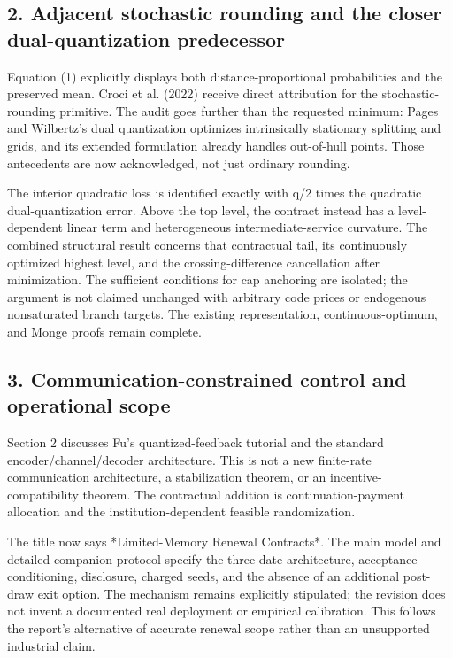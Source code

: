 \documentclass[11pt,letterpaper]{article}
\begin{document}
\subsection*{2. Adjacent stochastic rounding and the closer dual-quantization predecessor}


Equation (1) explicitly displays both distance-proportional probabilities and the preserved mean. Croci et al. (2022) receive direct attribution for the stochastic-rounding primitive. The audit goes further than the requested minimum: Pages and Wilbertz's dual quantization optimizes intrinsically stationary splitting and grids, and its extended formulation already handles out-of-hull points. Those antecedents are now acknowledged, not just ordinary rounding.



The interior quadratic loss is identified exactly with q/2 times the quadratic dual-quantization error. Above the top level, the contract instead has a level-dependent linear term and heterogeneous intermediate-service curvature. The combined structural result concerns that contractual tail, its continuously optimized highest level, and the crossing-difference cancellation after minimization. The sufficient conditions for cap anchoring are isolated; the argument is not claimed unchanged with arbitrary code prices or endogenous nonsaturated branch targets. The existing representation, continuous-optimum, and Monge proofs remain complete.



\subsection*{3. Communication-constrained control and operational scope}


Section 2 discusses Fu's quantized-feedback tutorial and the standard encoder/channel/decoder architecture. This is not a new finite-rate communication architecture, a stabilization theorem, or an incentive-compatibility theorem. The contractual addition is continuation-payment allocation and the institution-dependent feasible randomization.



The title now says *Limited-Memory Renewal Contracts*. The main model and detailed companion protocol specify the three-date architecture, acceptance conditioning, disclosure, charged seeds, and the absence of an additional post-draw exit option. The mechanism remains explicitly stipulated; the revision does not invent a documented real deployment or empirical calibration. This follows the report's alternative of accurate renewal scope rather than an unsupported industrial claim.
\end{document}
